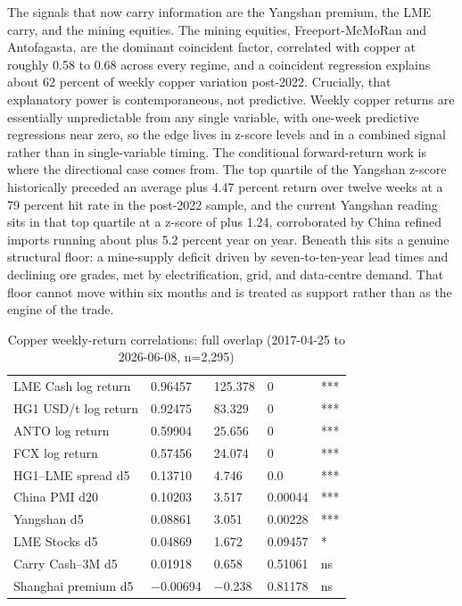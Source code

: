 \documentclass[11pt,a4paper]{article}
\begin{document}
The signals that now carry information are the Yangshan premium, the LME carry, and the mining equities. The mining equities, Freeport-McMoRan and Antofagasta, are the dominant coincident factor, correlated with copper at roughly 0.58 to 0.68 across every regime, and a coincident regression explains about 62 percent of weekly copper variation post-2022. Crucially, that explanatory power is contemporaneous, not predictive. Weekly copper returns are essentially unpredictable from any single variable, with one-week predictive regressions near zero, so the edge lives in z-score levels and in a combined signal rather than in single-variable timing. The conditional forward-return work is where the directional case comes from. The top quartile of the Yangshan z-score historically preceded an average plus 4.47 percent return over twelve weeks at a 79 percent hit rate in the post-2022 sample, and the current Yangshan reading sits in that top quartile at a z-score of plus 1.24, corroborated by China refined imports running about plus 5.2 percent year on year. Beneath this sits a genuine structural floor: a mine-supply deficit driven by seven-to-ten-year lead times and declining ore grades, met by electrification, grid, and data-centre demand. That floor cannot move within six months and is treated as support rather than as the engine of the trade.

\begin{table}[htbp]
\caption{Copper weekly-return correlations: full overlap (2017-04-25 to 2026-06-08, n=2,295)}
\small
\begin{tabularx}{\linewidth}{L Q{1.8cm} Q{1.8cm} Q{1.8cm} P{1.2cm}}
\toprule
{} &  &  &  &  \\
\midrule
LME Cash log return & 0.96457 & 125.378 & 0 & *** \\
HG1 USD/t log return & 0.92475 & 83.329 & 0 & *** \\
ANTO log return & 0.59904 & 25.656 & 0 & *** \\
FCX log return & 0.57456 & 24.074 & 0 & *** \\
HG1--LME spread d5 & 0.13710 & 4.746 & 0.0 & *** \\
China PMI d20 & 0.10203 & 3.517 & 0.00044 & *** \\
Yangshan d5 & 0.08861 & 3.051 & 0.00228 & *** \\
LME Stocks d5 & 0.04869 & 1.672 & 0.09457 & * \\
Carry Cash--3M d5 & 0.01918 & 0.658 & 0.51061 & ns \\
Shanghai premium d5 & \(-\)0.00694 & \(-\)0.238 & 0.81178 & ns \\
\bottomrule
\end{tabularx}
\end{table}
\end{document}
